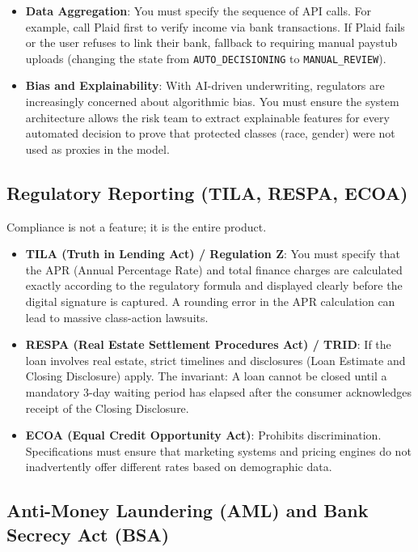 \documentclass[
  11pt,
  openany,
  oneside]{book}
\providecommand{\tightlist}{%
  \setlength{\itemsep}{0pt}\setlength{\parskip}{0pt}}
\begin{document}
\begin{itemize}
\tightlist
\item
  \textbf{Data Aggregation}: You must specify the sequence of API calls.
  For example, call Plaid first to verify income via bank transactions.
  If Plaid fails or the user refuses to link their bank, fallback to
  requiring manual paystub uploads (changing the state from
  \texttt{AUTO\_DECISIONING} to \texttt{MANUAL\_REVIEW}).
\item
  \textbf{Bias and Explainability}: With AI-driven underwriting,
  regulators are increasingly concerned about algorithmic bias. You must
  ensure the system architecture allows the risk team to extract
  explainable features for every automated decision to prove that
  protected classes (race, gender) were not used as proxies in the
  model.
\end{itemize}

\subsection{Regulatory Reporting (TILA, RESPA,
ECOA)}\label{regulatory-reporting-tila-respa-ecoa}

Compliance is not a feature; it is the entire product.

\begin{itemize}
\tightlist
\item
  \textbf{TILA (Truth in Lending Act) / Regulation Z}: You must specify
  that the APR (Annual Percentage Rate) and total finance charges are
  calculated exactly according to the regulatory formula and displayed
  clearly before the digital signature is captured. A rounding error in
  the APR calculation can lead to massive class-action lawsuits.
\item
  \textbf{RESPA (Real Estate Settlement Procedures Act) / TRID}: If the
  loan involves real estate, strict timelines and disclosures (Loan
  Estimate and Closing Disclosure) apply. The invariant: A loan cannot
  be closed until a mandatory 3-day waiting period has elapsed after the
  consumer acknowledges receipt of the Closing Disclosure.
\item
  \textbf{ECOA (Equal Credit Opportunity Act)}: Prohibits
  discrimination. Specifications must ensure that marketing systems and
  pricing engines do not inadvertently offer different rates based on
  demographic data.
\end{itemize}

\subsection{Anti-Money Laundering (AML) and Bank Secrecy Act
(BSA)}\label{anti-money-laundering-aml-and-bank-secrecy-act-bsa}
\end{document}
